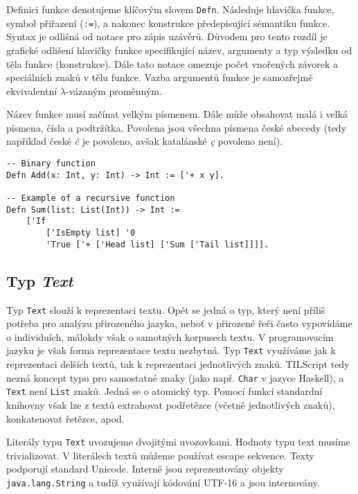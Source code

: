 Definici funkce denotujeme klíčovým slovem \lstinline{Defn}. Následuje hlavička funkce, symbol
přiřazení (\lstinline{:=}), a nakonec konstrukce předepisující sémantiku funkce. Syntax je odlišná
od notace pro zápis uzávěrů. Důvodem pro tento rozdíl je grafické odlišení hlavičky funkce
specifikující název, argumenty a typ výsledku od těla funkce (konstrukce). Dále tato notace
omezuje počet vnořených závorek a speciálních znaků v tělu funkce. Vazba argumentů funkce je
samozřejmě ekvivalentní $\lambda$-vázaným proměnným.

Název funkce musí začínat velkým písmenem. Dále může obsahovat malá i velká písmena, čísla
a podtržítka. Povolena jsou všechna písmena české abecedy (tedy například české \textit{č} je
povoleno, avšak katalánské \textit{\c{c}} povoleno není).

\begin{lstlisting}[caption={Příklad definice funkcí}]
-- Binary function
Defn Add(x: Int, y: Int) -> Int := ['+ x y].

-- Example of a recursive function
Defn Sum(list: List(Int)) -> Int :=
    ['If
        ['IsEmpty list] '0
        'True ['+ ['Head list] ['Sum ['Tail list]]]].
\end{lstlisting}

\subsection{Typ \textit{Text}} \label{text-type}

Typ \lstinline{Text} slouží k reprezentaci textu. Opět se jedná o typ, který není příliš potřeba
pro analýzu přirozeného jazyka, neboť v přirozené řeči často vypovídáme o individuích, málokdy však
o samotných korpusech textu. V programovacím jazyku je však forma reprezentace textu nezbytná.
Typ \lstinline{Text} využíváme jak k reprezentaci delších textů, tak k reprezentaci jednotlivých
znaků. TILScript tedy nezná koncept typu pro samostatné znaky (jako např. \lstinline{Char} v jazyce
Haskell), a \lstinline{Text} není \lstinline{List} znaků. Jedná se o atomický typ. Pomocí funkcí
standardní knihovny však lze z textů extrahovat podřetězce (včetně jednotlivých znaků),
konkatenovat řetězce, apod.

Literály typu \lstinline{Text} uvozujeme dvojitými uvozovkami. Hodnoty typu text musíme
trivializovat. V literálech textů můžeme používat escape sekvence. Texty podporují standard
Unicode. Interně jsou reprezentovány objekty \lstinline{java.lang.String} a tudíž využívají
kódování UTF-16 a jsou internovány.

